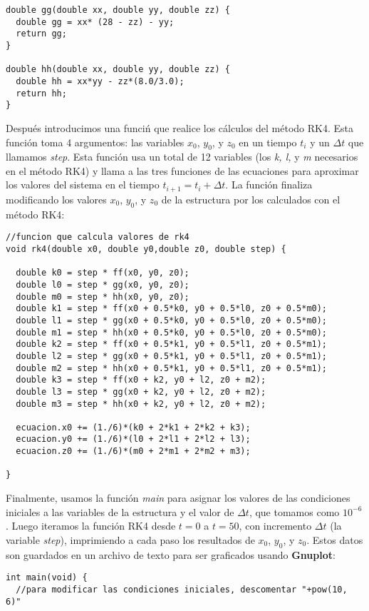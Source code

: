 \documentclass[letterpaper, 12pt]{article}
\begin{document}
{\begin{lstlisting}
double gg(double xx, double yy, double zz) {
  double gg = xx* (28 - zz) - yy;
  return gg;
}

double hh(double xx, double yy, double zz) {
  double hh = xx*yy - zz*(8.0/3.0);
  return hh;
}
\end{lstlisting}

Despu\'es introducimos una funci\'n que realice los c\'alculos del m\'etodo RK4. Esta funci\'on toma 4 argumentos: las variables $x_0$, $y_0$, y $z_0$ en un tiempo $t_i$ y un $\Delta t $ que llamamos \textit{step}. Esta funci\'on usa un total de 12 variables (los \textit{k, l,} y \textit{m} necesarios en el m\'etodo RK4) y llama a las tres funciones de las ecuaciones para aproximar los valores del sistema en el tiempo $t_{i+1} = t_i + \Delta t$. La funci\'on finaliza modificando los valores $x_0$, $y_0$, y $z_0$ de la estructura por los calculados con el m\'etodo RK4:
\begin{lstlisting}
//funcion que calcula valores de rk4
void rk4(double x0, double y0,double z0, double step) {

  double k0 = step * ff(x0, y0, z0);
  double l0 = step * gg(x0, y0, z0);
  double m0 = step * hh(x0, y0, z0);
  double k1 = step * ff(x0 + 0.5*k0, y0 + 0.5*l0, z0 + 0.5*m0);
  double l1 = step * gg(x0 + 0.5*k0, y0 + 0.5*l0, z0 + 0.5*m0);
  double m1 = step * hh(x0 + 0.5*k0, y0 + 0.5*l0, z0 + 0.5*m0);
  double k2 = step * ff(x0 + 0.5*k1, y0 + 0.5*l1, z0 + 0.5*m1);
  double l2 = step * gg(x0 + 0.5*k1, y0 + 0.5*l1, z0 + 0.5*m1);
  double m2 = step * hh(x0 + 0.5*k1, y0 + 0.5*l1, z0 + 0.5*m1);
  double k3 = step * ff(x0 + k2, y0 + l2, z0 + m2);
  double l3 = step * gg(x0 + k2, y0 + l2, z0 + m2);
  double m3 = step * hh(x0 + k2, y0 + l2, z0 + m2);

  ecuacion.x0 += (1./6)*(k0 + 2*k1 + 2*k2 + k3);
  ecuacion.y0 += (1./6)*(l0 + 2*l1 + 2*l2 + l3);
  ecuacion.z0 += (1./6)*(m0 + 2*m1 + 2*m2 + m3);
 
}
\end{lstlisting}

Finalmente, usamos la funci\'on \textit{main} para asignar los valores de las condiciones iniciales a las variables de la estructura y el valor de $\Delta t$, que tomamos como $10^{-6}$. Luego iteramos la funci\'on RK4 desde $t = 0$ a $t = 50$, con incremento $\Delta t$ (la variable \textit{step}), imprimiendo a cada paso los resultados de $x_0$, $y_0$, y $z_0$. Estos datos son guardados en un archivo de texto para ser graficados usando \textbf{Gnuplot}:
\begin{lstlisting}
int main(void) {
  //para modificar las condiciones iniciales, descomentar "+pow(10, 6)"
  

\end{lstlisting}}
\end{document}
